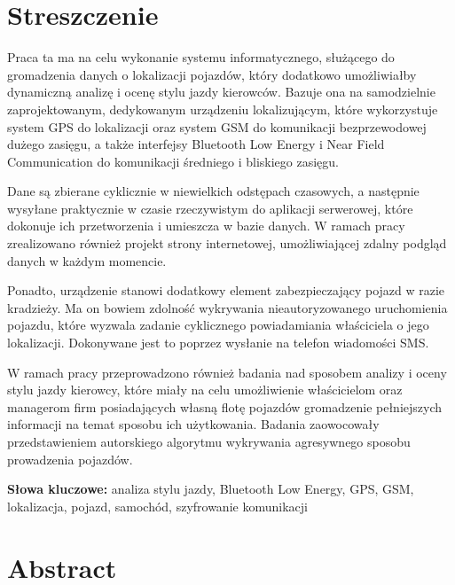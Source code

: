 

\chapter*{Streszczenie}

\flushbottom


\begin{singlespacing}

Praca ta ma na celu wykonanie systemu informatycznego, służącego do gromadzenia danych o lokalizacji pojazdów, który dodatkowo umożliwiałby dynamiczną analizę i ocenę stylu jazdy kierowców. Bazuje ona na samodzielnie zaprojektowanym, dedykowanym urządzeniu lokalizującym, które wykorzystuje system GPS do lokalizacji oraz system GSM do komunikacji bezprzewodowej dużego zasięgu, a także interfejsy Bluetooth Low Energy i Near Field Communication do komunikacji średniego i bliskiego zasięgu. 

Dane są zbierane cyklicznie w niewielkich odstępach czasowych, a następnie wysyłane praktycznie w czasie rzeczywistym do aplikacji serwerowej, które dokonuje ich przetworzenia i umieszcza w bazie danych. W ramach pracy zrealizowano również projekt strony internetowej, umożliwiającej zdalny podgląd danych w każdym momencie. 

Ponadto, urządzenie stanowi dodatkowy element zabezpieczający pojazd w razie kradzieży. Ma on bowiem zdolność wykrywania nieautoryzowanego uruchomienia pojazdu, które wyzwala zadanie cyklicznego powiadamiania właściciela o jego lokalizacji. Dokonywane jest to poprzez wysłanie na telefon  wiadomości SMS. 

W ramach pracy przeprowadzono również badania nad sposobem analizy i oceny stylu jazdy kierowcy, które miały na celu umożliwienie właścicielom oraz managerom firm posiadających własną flotę pojazdów gromadzenie pełniejszych informacji na temat sposobu ich użytkowania. Badania zaowocowały przedstawieniem autorskiego algorytmu wykrywania agresywnego sposobu prowadzenia pojazdów.

\textbf{Słowa kluczowe: }analiza stylu jazdy, Bluetooth Low Energy, GPS, GSM, lokalizacja, pojazd, samochód, szyfrowanie komunikacji

\end{singlespacing}


\chapter*{Abstract}

